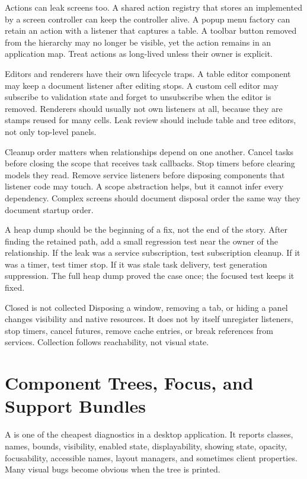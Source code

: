 Actions can leak screens too. A shared action registry that stores an  implemented by a screen controller can keep the controller alive. A popup menu factory can retain an action with a listener that captures a table. A toolbar button removed from the hierarchy may no longer be visible, yet the action remains in an application map. Treat actions as long-lived unless their owner is explicit.

Editors and renderers have their own lifecycle traps. A table editor component may keep a document listener after editing stops. A custom cell editor may subscribe to validation state and forget to unsubscribe when the editor is removed. Renderers should usually not own listeners at all, because they are stamps reused for many cells. Leak review should include table and tree editors, not only top-level panels.

Cleanup order matters when relationships depend on one another. Cancel tasks before closing the scope that receives task callbacks. Stop timers before clearing models they read. Remove service listeners before disposing components that listener code may touch. A scope abstraction helps, but it cannot infer every dependency. Complex screens should document disposal order the same way they document startup order.

A heap dump should be the beginning of a fix, not the end of the story. After finding the retained path, add a small regression test near the owner of the relationship. If the leak was a service subscription, test subscription cleanup. If it was a timer, test timer stop. If it was stale task delivery, test generation suppression. The full heap dump proved the case once; the focused test keeps it fixed.

\begin{pitfallbox}{Closed is not collected}
Disposing a window, removing a tab, or hiding a panel changes visibility and native resources. It does not by itself unregister listeners, stop timers, cancel futures, remove cache entries, or break references from services. Collection follows reachability, not visual state.
\end{pitfallbox}

\section{Component Trees, Focus, and Support Bundles}

A  is one of the cheapest diagnostics in a desktop application. It reports classes, names, bounds, visibility, enabled state, displayability, showing state, opacity, focusability, accessible names, layout managers, and sometimes client properties. Many visual bugs become obvious when the tree is printed.

